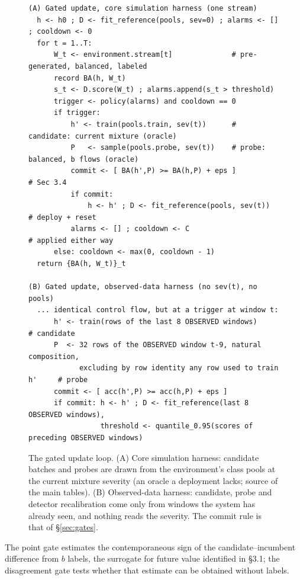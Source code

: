 \documentclass[journal]{IEEEtran}
\begin{document}
\begin{figure}[t]
\small
\begin{verbatim}
(A) Gated update, core simulation harness (one stream)
  h <- h0 ; D <- fit_reference(pools, sev=0) ; alarms <- [] ; cooldown <- 0
  for t = 1..T:
      W_t <- environment.stream[t]              # pre-generated, balanced, labeled
      record BA(h, W_t)
      s_t <- D.score(W_t) ; alarms.append(s_t > threshold)
      trigger <- policy(alarms) and cooldown == 0
      if trigger:
          h' <- train(pools.train, sev(t))      # candidate: current mixture (oracle)
          P   <- sample(pools.probe, sev(t))    # probe: balanced, b flows (oracle)
          commit <- [ BA(h',P) >= BA(h,P) + eps ]                  # Sec 3.4
          if commit:
              h <- h' ; D <- fit_reference(pools, sev(t))          # deploy + reset
          alarms <- [] ; cooldown <- C                             # applied either way
      else: cooldown <- max(0, cooldown - 1)
  return {BA(h, W_t)}_t

(B) Gated update, observed-data harness (no sev(t), no pools)
  ... identical control flow, but at a trigger at window t:
      h' <- train(rows of the last 8 OBSERVED windows)             # candidate
      P  <- 32 rows of the OBSERVED window t-9, natural composition,
            excluding by row identity any row used to train h'     # probe
      commit <- [ acc(h',P) >= acc(h,P) + eps ]
      if commit: h <- h' ; D <- fit_reference(last 8 OBSERVED windows),
                 threshold <- quantile_0.95(scores of preceding OBSERVED windows)
\end{verbatim}
\caption{The gated update loop. (A) Core simulation harness: candidate batches and probes are drawn from the environment's class pools at the current mixture severity (an oracle a deployment lacks; source of the main tables). (B) Observed-data harness: candidate, probe and detector recalibration come only from windows the system has already seen, and nothing reads the severity. The commit rule is that of \S\ref{sec:gates}.}
\label{fig:algorithm}
\end{figure}


The point gate estimates the contemporaneous sign of the candidate--incumbent difference from $b$ labels, the surrogate for future value identified in \S3.1; the disagreement gate tests whether that estimate can be obtained without labels.
\end{document}

